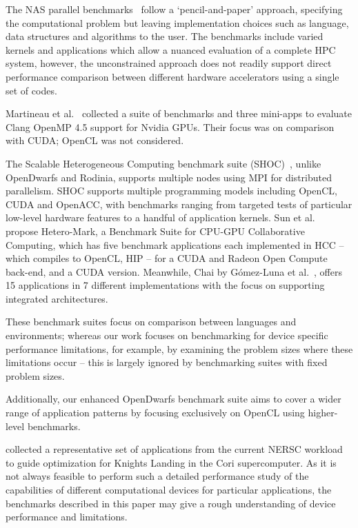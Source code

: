 \documentclass[../document.tex]{subfiles}
\begin{document}
\label{sec:related_work}
	
The NAS parallel benchmarks~\cite{bailey1991parallel} follow a `pencil-and-paper' approach, specifying the computational problem but leaving implementation choices such as language, data structures and algorithms to the user.
The benchmarks include varied kernels and applications which allow a nuanced evaluation of a complete HPC system, however, the unconstrained approach does not readily support direct performance comparison between different hardware accelerators using a single set of codes.

Martineau et al.~\cite{martineau2016performance} collected a suite of benchmarks and three mini-apps to evaluate Clang OpenMP 4.5 support for Nvidia GPUs.
Their focus was on comparison with CUDA; OpenCL was not considered.

The Scalable Heterogeneous Computing benchmark suite (SHOC)~\cite{lopez2015examining}, unlike OpenDwarfs and Rodinia, supports multiple nodes using MPI for distributed parallelism.
SHOC supports multiple programming models including OpenCL, CUDA and OpenACC, with benchmarks ranging from targeted tests of particular low-level hardware features to a handful of application kernels.
Sun et al.~\cite{sun2016} propose Hetero-Mark, a Benchmark Suite for CPU-GPU Collaborative Computing, which has five benchmark applications each implemented in HCC -- which compiles to OpenCL, HIP -- for a CUDA and Radeon Open Compute back-end, and a CUDA version.
Meanwhile, Chai by G{\'o}mez-Luna et al.~\cite{gomez2017chai}, offers 15 applications in 7 different implementations with the focus on supporting integrated architectures.

These benchmark suites focus on comparison between languages and environments; whereas our work focuses on benchmarking for device specific performance limitations, for example, by examining the problem sizes where these limitations occur -- this is largely ignored by benchmarking suites with fixed problem sizes.

Additionally, our enhanced OpenDwarfs benchmark suite aims to cover a wider range of application patterns by focusing exclusively on OpenCL using higher-level benchmarks.

\citet{barnes2016evaluating} collected a representative set of applications from the current NERSC workload to guide optimization for Knights Landing in the Cori supercomputer.
As it is not always feasible to perform such a detailed performance study of the capabilities of different computational devices for particular applications, the benchmarks described in this paper may give a rough understanding of device performance and limitations.
\end{document}
